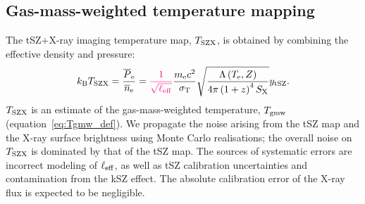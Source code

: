 \documentclass[twocolumn,traditabstract]{aa}
\newcommand{\ccor}[1]{\textcolor{Mypink}{#1}}
\def\TSZ {T_{\rm SZX}}
\def\TMW {T_{\rm gmw}}
\begin{document}
\subsection{Gas-mass-weighted temperature mapping}
The tSZ+X-ray imaging temperature map, \ccor{$\TSZ$}, is obtained by combining the effective density and pressure: 
\begin{equation}
	k_{\rm B} \TSZ 
	= \frac{\overline{P}_{\rm e}}{\overline{n}_{\rm e}} = \ccor{\frac{1}{\sqrt{\ell_{\rm eff}}}} \frac{m_{\rm e} c^2}{\sigma_{\rm T}} \sqrt{\frac{\Lambda\left(T_{\rm e}, Z\right)}{4 \pi \left(1+z\right)^4 S_{\rm X}}} y_{\rm tSZ}.
\label{eq:pseudo_tsz}
\end{equation}
\ccor{$\TSZ$ is an estimate of the gas-mass-weighted temperature, $\TMW$ (equation~\ref{eq:Tgmw_def}).} We propagate the noise arising from the tSZ map and the X-ray surface brightness using Monte Carlo realisations; the overall noise on $\TSZ$ is dominated by that of the tSZ map. \ccor{The sources of systematic errors are incorrect modeling of $\ell_{\rm eff}$, as well as tSZ calibration uncertainties and contamination from the kSZ effect. The absolute calibration error of the X-ray flux is expected to be negligible.}
\end{document}
